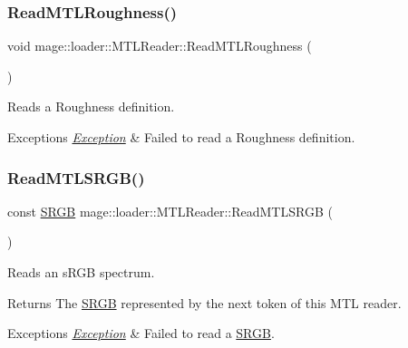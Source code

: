 \subsubsection{\texorpdfstring{Read\+M\+T\+L\+Roughness()}{ReadMTLRoughness()}}
{\footnotesize\ttfamily void mage\+::loader\+::\+M\+T\+L\+Reader\+::\+Read\+M\+T\+L\+Roughness (\begin{DoxyParamCaption}{ }\end{DoxyParamCaption})\hspace{0.3cm}{\ttfamily [private]}}

Reads a Roughness definition.


\begin{DoxyExceptions}{Exceptions}
{\em \hyperlink{classmage_1_1_exception}{Exception}} & Failed to read a Roughness definition. \\
\hline
\end{DoxyExceptions}
\hypertarget{classmage_1_1loader_1_1_m_t_l_reader_aaf1ee000e25870c5391cb47e09c896b4}{}\label{classmage_1_1loader_1_1_m_t_l_reader_aaf1ee000e25870c5391cb47e09c896b4} 
\subsubsection{\texorpdfstring{Read\+M\+T\+L\+S\+R\+G\+B()}{ReadMTLSRGB()}}
{\footnotesize\ttfamily const \hyperlink{structmage_1_1_s_r_g_b}{S\+R\+GB} mage\+::loader\+::\+M\+T\+L\+Reader\+::\+Read\+M\+T\+L\+S\+R\+GB (\begin{DoxyParamCaption}{ }\end{DoxyParamCaption})\hspace{0.3cm}{\ttfamily [private]}}

Reads an s\+R\+GB spectrum.

\begin{DoxyReturn}{Returns}
The {\ttfamily \hyperlink{structmage_1_1_s_r_g_b}{S\+R\+GB}} represented by the next token of this M\+TL reader. 
\end{DoxyReturn}

\begin{DoxyExceptions}{Exceptions}
{\em \hyperlink{classmage_1_1_exception}{Exception}} & Failed to read a {\ttfamily \hyperlink{structmage_1_1_s_r_g_b}{S\+R\+GB}}. \\
\hline
\end{DoxyExceptions}
\hypertarget{classmage_1_1loader_1_1_m_t_l_reader_aebc0aa1ff4679968716e166d2bc1cc23}{}\label{classmage_1_1loader_1_1_m_t_l_reader_aebc0aa1ff4679968716e166d2bc1cc23} 
